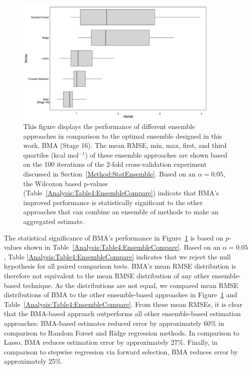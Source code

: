 \documentclass[journal=jpcbfk, manuscript=article]{achemso}
\newcommand{\+}[1]{\ensuremath{\mathbf{#1}}}
\newcommand{\rev}[1]{#1}
\begin{document}
\begin{figure}
	\centering
	\includegraphics[keepaspectratio,width=0.9\textwidth]{Figures/BMA_Xval_baselineModels_RMSE}
	\caption{This figure displays the performance of different ensemble approaches in comparison to the optimal ensemble designed in this work, BMA (Stage 16).
	The mean \rev{RMSE}, min, max, first, and third quartiles (kcal mol$^{-1}$) of these ensemble approaches are shown based on the 100 iterations of the 2-fold cross-validation experiment discussed in Section~\ref{Method:StatEnsemble}.
	Based on an $\alpha = 0.05$, the Wilcoxon based p-values (Table~\ref{Analysis:Table4:EnsembleCompare}) indicate that BMA's improved performance is statistically significant to the other approaches that can combine an ensemble of methods to make an aggregated estimate.}
	\label{Analysis:Figure6:Models}
\end{figure}
The statistical significance of BMA's performance in Figure~\ref{Analysis:Figure6:Models} is based on $p$-values shown in Table~\ref{Analysis:Table4:EnsembleCompare}. Based on an $\alpha = 0.05$, Table \ref{Analysis:Table4:EnsembleCompare} indicates that we reject the null hypothesis for all paired comparison tests.
BMA's mean RMSE distribution is therefore not equivalent to the mean RMSE distribution of any other ensemble-based technique. 
As the distributions are not equal, we compared mean RMSE distributions of BMA to the other ensemble-based approaches in Figure~\ref{Analysis:Figure6:Models} and Table~\ref{Analysis:Table4:EnsembleCompare}.
From these mean RMSEs, it is clear that the BMA-based approach outperforms all other ensemble-based \rev{estimation} approaches: BMA-based estimates reduced error by approximately 60\% in comparison to Random Forest and Ridge regression methods. In comparison to Lasso, BMA reduces estimation error by approximately 27\%.
Finally, in comparison to stepwise regression via forward selection, BMA reduces error by approximately 25\%.
\end{document}
